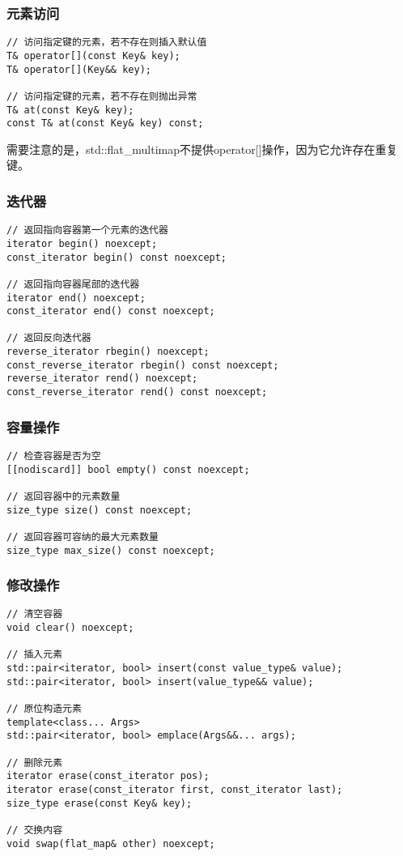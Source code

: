 \documentclass[a4paper, 12pt]{article}
\begin{document}
\subsubsection{元素访问}

\begin{lstlisting}[style=cpp]
// 访问指定键的元素，若不存在则插入默认值
T& operator[](const Key& key);
T& operator[](Key&& key);

// 访问指定键的元素，若不存在则抛出异常
T& at(const Key& key);
const T& at(const Key& key) const;
\end{lstlisting}

需要注意的是，std::flat\_multimap不提供operator[]操作，因为它允许存在重复键。

\subsubsection{迭代器}

\begin{lstlisting}[style=cpp]
// 返回指向容器第一个元素的迭代器
iterator begin() noexcept;
const_iterator begin() const noexcept;

// 返回指向容器尾部的迭代器
iterator end() noexcept;
const_iterator end() const noexcept;

// 返回反向迭代器
reverse_iterator rbegin() noexcept;
const_reverse_iterator rbegin() const noexcept;
reverse_iterator rend() noexcept;
const_reverse_iterator rend() const noexcept;
\end{lstlisting}

\subsubsection{容量操作}

\begin{lstlisting}[style=cpp]
// 检查容器是否为空
[[nodiscard]] bool empty() const noexcept;

// 返回容器中的元素数量
size_type size() const noexcept;

// 返回容器可容纳的最大元素数量
size_type max_size() const noexcept;
\end{lstlisting}

\subsubsection{修改操作}

\begin{lstlisting}[style=cpp]
// 清空容器
void clear() noexcept;

// 插入元素
std::pair<iterator, bool> insert(const value_type& value);
std::pair<iterator, bool> insert(value_type&& value);

// 原位构造元素
template<class... Args>
std::pair<iterator, bool> emplace(Args&&... args);

// 删除元素
iterator erase(const_iterator pos);
iterator erase(const_iterator first, const_iterator last);
size_type erase(const Key& key);

// 交换内容
void swap(flat_map& other) noexcept;
\end{lstlisting}
\end{document}
